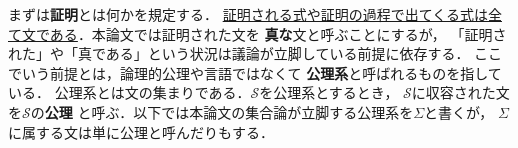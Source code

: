 	
	まずは{\bf 証明}とは何かを規定する．
	\underline{証明される式や証明の過程で出てくる式は全て文である}．本論文では証明された文を
	{\bf 真な}文と呼ぶことにするが，
	「証明された」や「真である」という状況は議論が立脚している前提に依存する．
	ここでいう前提とは，論理的公理や言語ではなくて
	{\bf 公理系}と呼ばれるものを指している．
	公理系とは文の集まりである．$\mathscr{S}$を公理系とするとき，
	$\mathscr{S}$に収容された文を$\mathscr{S}$の{\bf 公理}
	と呼ぶ．以下では本論文の集合論が立脚する公理系を$\Sigma$と書くが，
	$\Sigma$に属する文は単に公理と呼んだりもする．
	
